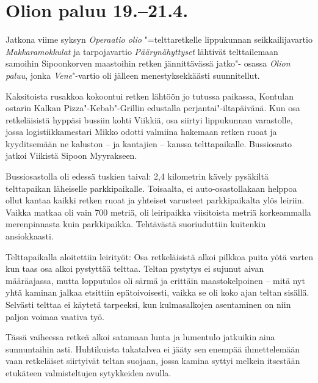 
\section{Olion paluu 19.--21.4.}

\begin{multicols}{2}

	\noindent Jatkona viime syksyn \textit{Operaatio olio} "=telttaretkelle lippukunnan
	seikkailijavartio \textit{Makkaramokkulat} ja tarpojavartio \textit{Päärynähyttyset} lähtivät
	telttailemaan samoihin Sipoonkorven maastoihin retken jännittävässä jatko"-
	osassa \textit{Olion paluu}, jonka \textit{Vene}"-vartio oli jälleen menestyksekkäästi
	suunnitellut.

	Kaksitoista rusakkoa kokoontui retken lähtöön jo tutussa paikassa,
	Kontulan ostarin Kalkan Pizza"-Kebab"-Grillin edustalla
	perjantai"-iltapäivänä. Kun osa retkeläisistä hyppäsi bussiin kohti
	Viikkiä, osa siirtyi lippukunnan varastolle, jossa logistiikkamestari
	Mikko odotti valmiina hakemaan retken ruoat ja kyyditsemään ne kaluston
	-- ja kantajien -- kanssa telttapaikalle. Bussiosasto jatkoi Viikistä
	Sipoon Myyrakseen. 

	Bussiosastolla oli edessä tuskien taival: 2,4 kilometrin kävely
	pysäkiltä telttapaikan läheiselle parkkipaikalle. Toisaalta, ei
	auto-osastollakaan helppoa ollut kantaa kaikki retken ruoat ja yhteiset
	varusteet parkkipaikalta ylös leiriin. Vaikka matkaa oli vain 700
	metriä, oli leiripaikka viisitoista metriä korkeammalla merenpinnasta
	kuin parkkipaikka. Tehtävästä suoriuduttiin kuitenkin ansiokkaasti.

	Telttapaikalla aloitettiin leirityöt: Osa retkeläisistä alkoi pilkkoa
	puita yötä varten kun taas osa alkoi pystyttää telttaa. Teltan pystytys
	ei sujunut aivan määräajassa, mutta lopputulos oli särmä ja erittäin
	maastokelpoinen -- mitä nyt yhtä kaminan jalkaa etsittiin
	epätoivoisesti, vaikka se oli koko ajan teltan sisällä. Selvästi
	telttaa ei käytetä tarpeeksi, kun kulmasalkojen asentaminen on niin
	paljon voimaa vaativa työ.

	Tässä vaiheessa retkeä alkoi satamaan lunta ja lumentulo jatkuikin aina
	sunnuntaihin asti. Huhtikuista takatalvea ei jääty sen enempää
	ihmettelemään vaan retkeläiset siirtyivät teltan suojaan, jossa kamina
	syttyi melkein itsestään etukäteen valmisteltujen sytykkeiden avulla. 


\end{multicols}
